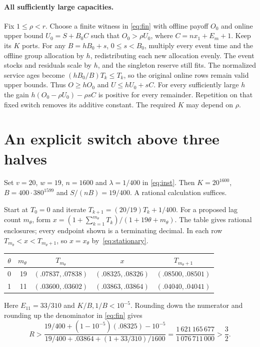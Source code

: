 \documentclass[11pt,letterpaper]{article}
\begin{document}
\paragraph{All sufficiently large capacities.}
Fix $1\le\rho<r$. Choose a finite witness in \eqref{eq:fin} with offline payoff $O_0$ and online upper bound $U_0=S+B_0C$ such that $O_0>\rho U_0$, where $C=nx_1+E_m+1$. Keep its $K$ ports. For any $B=hB_0+s$, $0\le s<B_0$, multiply every event time and the offline group allocation by $h$, redistributing each new allocation evenly. The event stocks and residuals scale by $h$, and the singleton reserve still fits. The normalized service ages become $(hB_0/B)T_k\le T_k$, so the original online rows remain valid upper bounds. Thus $O\ge hO_0$ and $U\le hU_0+sC$. For every sufficiently large $h$ the gain $h(O_0-\rho U_0)-\rho sC$ is positive for every remainder. Repetition on that fixed switch removes its additive constant. The required $K$ may depend on $\rho$.

\newpage
\section{An explicit switch above three halves}
Set $v=20$, $w=19$, $n=1600$ and $\lambda=1/400$ in \eqref{eq:inst}. Then $K=20^{1600}$, $B=400\cdot380^{1599}$ and $S/(nB)=19/400$. A rational calculation suffices.

Start at $T_0=0$ and iterate $T_{k+1}=(20/19)T_k+1/400$. For a proposed lag count $m_\theta$, form $x=(1+\sum_{k=1}^{m_\theta}T_k)/(1+19\theta+m_\theta)$. The table gives rational enclosures; every endpoint shown is a terminating decimal. In each row $T_{m_\theta}<x<T_{m_\theta+1}$, so $x=x_\theta$ by~\eqref{eq:stationary}.
\begin{center}
\begin{tabular}{@{}crccc@{}}\toprule
$\theta$ & $m_\theta$ & $T_{m_\theta}$ & $x$ & $T_{m_\theta+1}$\\\midrule
0 & 19 & $(.07837,.07838)$ & $(.08325,.08326)$ & $(.08500,.08501)$\\
1 & 11 & $(.03600,.03602)$ & $(.03863,.03864)$ & $(.04040,.04041)$\\\bottomrule
\end{tabular}
\end{center}
Here $E_{11}=33/310$ and $K/B,1/B<10^{-5}$. Rounding down the numerator and rounding up the denominator in \eqref{eq:fin} gives
\[
 R>
 \frac{19/400+(1-10^{-5})(.08325)-10^{-5}}
      {19/400+.03864+(1+33/310)/1600}
 =\frac{1\,621\,165\,677}{1\,076\,711\,000}>\frac32 .
\]
\end{document}
